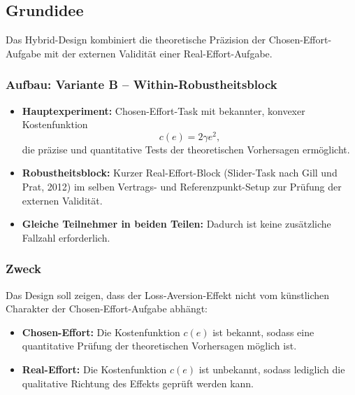 \documentclass[
    11pt,
    a4paper,
    parskip=half,
    headings=normal
]{scrartcl}
\numberwithin{equation}{section}
\theoremstyle{definition}
\theoremstyle{remark}
\begin{document}
\subsection{Grundidee}

Das Hybrid-Design kombiniert die theoretische Präzision der Chosen-Effort-Aufgabe mit der externen Validität einer Real-Effort-Aufgabe.

\subsubsection{Aufbau: Variante B -- Within-Robustheitsblock}

\begin{itemize}

    \item \textbf{Hauptexperiment:} Chosen-Effort-Task mit bekannter, konvexer Kostenfunktion
    \[
        c(e) = 2\gamma e^2,
    \]
    die präzise und quantitative Tests der theoretischen Vorhersagen ermöglicht.

    \item \textbf{Robustheitsblock:} Kurzer Real-Effort-Block (Slider-Task nach Gill und Prat, 2012) im selben Vertrags- und Referenzpunkt-Setup zur Prüfung der externen Validität.

    \item \textbf{Gleiche Teilnehmer in beiden Teilen:} Dadurch ist keine zusätzliche Fallzahl erforderlich.

\end{itemize}

\subsubsection{Zweck}

Das Design soll zeigen, dass der Loss-Aversion-Effekt nicht vom künstlichen Charakter der Chosen-Effort-Aufgabe abhängt:

\begin{itemize}

    \item \textbf{Chosen-Effort:} Die Kostenfunktion $c(e)$ ist bekannt, sodass eine quantitative Prüfung der theoretischen Vorhersagen möglich ist.

    \item \textbf{Real-Effort:} Die Kostenfunktion $c(e)$ ist unbekannt, sodass lediglich die qualitative Richtung des Effekts geprüft werden kann.

\end{itemize}
\end{document}
